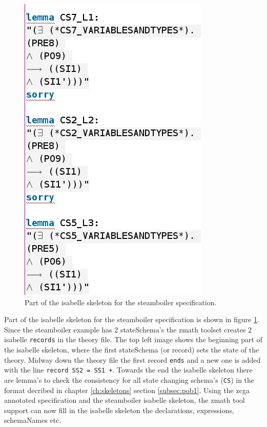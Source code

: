 \begin{figure}[H]
\begin{minipage}{0.53\textwidth}
\end{minipage}
\begin{minipage}{0.45\textwidth}
\centering
\includegraphics[scale=0.5]{Figures/Evaluation/4imagec.png}
\end{minipage}
\caption{Part of the isabelle skeleton for the steamboiler specification.\label{fig:steamisaskel}}
\end{figure}

Part of the isabelle skeleton for the steamboiler specification is shown in figure \ref{fig:steamisaskel}. Since the steamboiler example has 2 stateSchema's the \gls{zmath} toolset creates 2 isabelle 	\texttt{records} in the theory file. The top left image shows the beginning part of the isabelle skeleton, where the first stateSchema (or record) sets the state of the theory. Midway down the theory file the first record \texttt{ends} and a new one is added with the line \verb|record SS2 = SS1 +|. Towards the end the isabelle skeleton there are lemma's to check the consistency for all state changing schema's (\texttt{CS}) in the format decribed in chapter \ref{ch:skeletons} section \ref{subsec:pob1}. Using the \gls{zcga} annotated specification and the steamboiler isabelle skeleton, the \gls{zmath} tool support can now fill in the isabelle skeleton the declarations, expressions, schemaNames etc.


